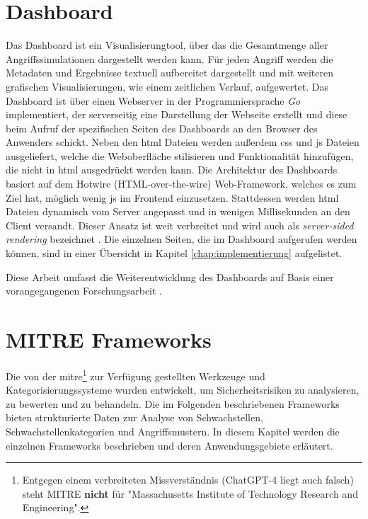 \section{Dashboard}
\label{sec:tech-dashboard}
Das Dashboard ist ein Visualisierungtool, über das die Gesamtmenge aller Angriffssimulationen dargestellt werden kann. Für jeden Angriff werden die Metadaten und Ergebnisse textuell aufbereitet dargestellt und mit weiteren grafischen Visualisierungen, wie einem zeitlichen Verlauf, aufgewertet.
Das Dashboard ist über einen Webserver in der Programmiersprache \textit{Go} implementiert, der serverseitig eine Darstellung der Webseite erstellt und diese beim Aufruf der spezifischen Seiten des Dashboards an den Browser des Anwenders schickt. Neben den \gls{html} Dateien werden außerdem \gls{css} und \gls{js} Dateien ausgeliefert, welche die Weboberfläche stilisieren und Funktionalität hinzufügen, die nicht in \gls{html} ausgedrückt werden kann. Die Architektur des Dashboards basiert auf dem Hotwire (HTML-over-the-wire) Web-Framework, welches es zum Ziel hat, möglich wenig \gls{js} im Frontend einzusetzen. Stattdessen werden \gls{html} Dateien dynamisch vom Server angepasst und in wenigen Millisekunden an den Client versandt. Dieser Ansatz ist weit verbreitet und wird auch als \textit{server-sided rendering} bezeichnet \autocite{HTMLWireHotwire}. Die einzelnen Seiten, die im Dashboard aufgerufen werden können, sind in einer Übersicht in Kapitel \ref{chap:implementierung} aufgelistet.
\par Diese Arbeit umfasst die Weiterentwicklung des Dashboards auf Basis einer vorangegangenen Forschungsarbeit \autocite{weberEvaluationDashboardTechniques}.

\label{bg:mitre-frameworks}
\section{MITRE Frameworks}
Die von der \gls{mitre}\footnote{Entgegen einem verbreiteten Missverständnis (ChatGPT-4 liegt auch falsch) steht MITRE \textbf{nicht} für "Massachusetts Institute of Technology Research and Engineering".} zur Verfügung gestellten Werkzeuge und Kategorisierungssysteme wurden entwickelt, um Sicherheitsrisiken zu analysieren, zu bewerten und zu behandeln. Die im Folgenden beschriebenen Frameworks bieten strukturierte Daten zur Analyse von Schwachstellen, Schwachstellenkategorien und Angriffsmustern. In diesem Kapitel werden die einzelnen Frameworks beschrieben und deren Anwendungsgebiete erläutert.

